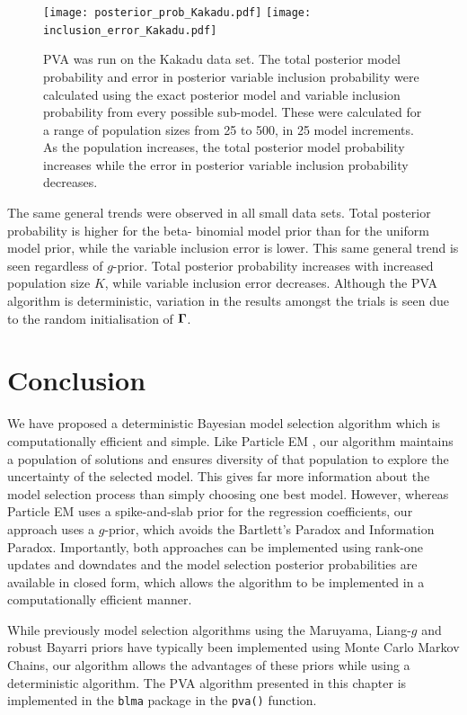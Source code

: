 \begin{figure}[ht!]
	\texttt{[image: posterior\_prob\_Kakadu.pdf]}
	\texttt{[image: inclusion\_error\_Kakadu.pdf]}

	\caption{PVA was run on the Kakadu data set. The total posterior model probability and error in posterior 
						variable inclusion probability were calculated using the exact posterior model and variable  
						inclusion probability from every possible sub-model. These were calculated for a range of 
						population sizes from 25 to 500, in 25 model increments.
						As the population increases, the total posterior model probability increases while the error in 
						posterior variable inclusion probability decreases.}
	\label{fig:kakadu_total_posterior_mass}
\end{figure}


The same general trends were observed in all small data sets. Total posterior probability is higher for the
beta- binomial model prior than for the uniform model prior, while the variable inclusion error is lower. This
same general trend is seen regardless of $g$-prior. Total posterior probability increases with increased
population size $K$, while variable inclusion error decreases. Although the PVA algorithm is deterministic,
variation in the results amongst the trials is seen due to the random initialisation of ${\boldsymbol \Gamma}$.

\section{Conclusion}
\label{sec:chapter_4_conclusion}
We have proposed a deterministic Bayesian model selection algorithm which is computationally efficient
and simple. Like Particle EM \citep{Rockova2017}, our algorithm maintains a population of solutions and ensures
diversity of that population to explore the uncertainty of the selected model. This gives far more information
about the model selection process than simply choosing one best model. However, whereas Particle EM uses
a spike-and-slab prior for the regression coefficients, our approach uses a $g$-prior, which avoids 
the Bartlett's Paradox and Information Paradox. Importantly, both approaches can be implemented using rank-one
updates and downdates and the model selection posterior probabilities are available in closed form,
which allows the algorithm to be implemented in a computationally efficient manner.

While previously model selection algorithms using the Maruyama, Liang-$g$ and robust Bayarri priors have
typically been implemented using Monte Carlo Markov Chains, our algorithm allows the advantages of these
priors while using a deterministic algorithm. The PVA algorithm  presented in this chapter is implemented in
the {\tt blma} package in the {\tt pva()} function.
